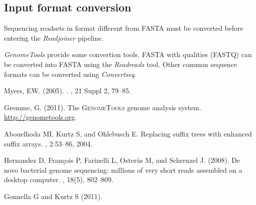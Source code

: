 \documentclass[12pt,titlepage]{article}
\newcommand{\GenomeTools}{\textit{GenomeTools}\xspace}
\newcommand{\Readjoiner}{\textit{Readjoiner}\xspace}
\newcommand{\Gtconvertseq}{\textit{Convertseq}\xspace}
\newcommand{\Gtreadreads}{\textit{Readreads}\xspace}
\begin{document}
\subsection{Input format conversion}
\label{nonfastainput}

Sequencing readsets in format different from FASTA must be converted before
entering the \Readjoiner pipeline.

\GenomeTools provide some convertion tools.
FASTA with qualities (FASTQ) can be converted into FASTA using the \Gtreadreads
tool. Other common sequence formats can be converted using \Gtconvertseq.

\begin{thebibliography}{1}

Myers, EW. (2005).
.
, {21 Suppl 2}, 79--85.

Gremme, G. (2011).
\newblock The \textsc{GenomeTools} genome analysis system.
  \url{http://genometools.org}.

Abouelhoda MI, Kurtz S, and Ohlebusch E.
\newblock Replacing suffix trees with enhanced suffix arrays.
, 2:53--86, 2004.

Hernandez D, François P, Farinelli L, Osterås M, and Schrenzel J.
  (2008).
\newblock De novo bacterial genome sequencing: millions of very short reads
  assembled on a desktop computer.
, {18}(5), 802--809.

Gonnella G and Kurtz S (2011).

\end{thebibliography}
\end{document}
